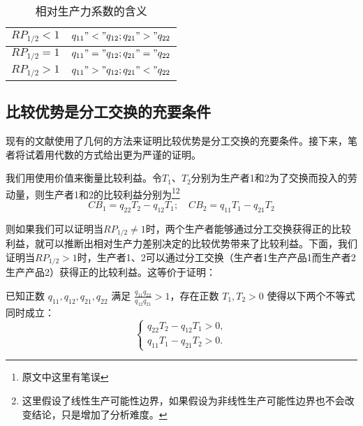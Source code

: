 \begin{table}
    \centering
    \caption{相对生产力系数的含义\cite[48-49]{CaiJiMingCongXiaYiJieZhiLunDaoGuangYiJieZhiLunXiuDingBan2022}}
    \label{table:RP_{1/2}}
    \begin{tabular}{|l|l|}
    \hline
        $\mathit{RP}_{1/2}<1$ & $q_{11} \quad "<" \quad q_{12}; \quad q_{21} \quad ">" \quad q_{22}$ \\ \hline
        $\mathit{RP}_{1/2}=1$ & $q_{11} \quad "=" \quad q_{12}; \quad q_{21} \quad "=" \quad q_{22}$ \\ \hline
        $\mathit{RP}_{1/2}>1$ & $q_{11} \quad ">" \quad q_{12}; \quad q_{21} \quad "<" \quad q_{22}$ \\ \hline
    \end{tabular}
\end{table}

\subsection{比较优势是分工交换的充要条件}

现有的文献使用了几何的方法来证明比较优势是分工交换的充要条件。接下来，笔者将试着用代数的方式给出更为严谨的证明。

我们用使用价值来衡量比较利益\cite[63]{CaiJiMingGuangYiJieZhiLun2001}。令$T_1$、$T_2$分别为生产者1和2为了交换而投入的劳动量，则生产者1和2的比较利益分别为\footnote{原文中这里有笔误}\footnote{这里假设了线性生产可能性边界，如果假设为非线性生产可能性边界也不会改变结论，只是增加了分析难度\cite[285]{LiRenJunJieZhiLiLun2004}。}
\begin{equation}
    \mathit{CB}_1 = q_{22}T_2 - q_{12}T_1 ; \quad \mathit{CB}_2 = q_{11}T_1 - q_{21}T_2  
\end{equation}

则如果我们可以证明当$\mathit{RP}_{1/2} \neq 1$时，两个生产者能够通过分工交换获得正的比较利益，就可以推断出相对生产力差别决定的比较优势带来了比较利益。下面，我们证明当$RP_{1/2} > 1$时，生产者1、2可以通过分工交换（生产者1生产产品1而生产者2生产产品2）获得正的比较利益。这等价于证明：

\begin{proposition}
    已知正数 $ q_{11}, q_{12}, q_{21}, q_{22} $ 满足 $\frac{q_{11}q_{22}}{q_{12}q_{21}} > 1$，存在正数 $T_1,T_2 > 0$ 使得以下两个不等式同时成立：
    $$
        \begin{cases}
            q_{22}T_2 - q_{12}T_1 > 0, \\
            q_{11}T_1 - q_{21}T_2 > 0.
        \end{cases}
    $$    
\end{proposition}

